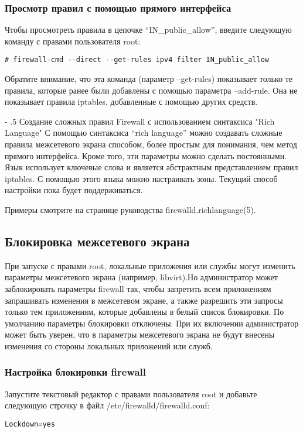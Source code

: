 \documentclass[a4paper,10pt,twoside]{article}
\makeatletter
\renewcommand\paragraph{%
   \@startsection{paragraph}{4}{0mm}%
      {-\baselineskip}%
      {.5\baselineskip}%
      {\normalfont\normalsize\bfseries}}
\makeatother
\begin{document}
\subsubsection{Просмотр правил с помощью прямого интерфейса}
Чтобы просмотреть правила в цепочке “IN\_public\_allow”, введите следующую команду с правами пользователя root: 
\begin{verbatim}
# firewall-cmd --direct --get-rules ipv4 filter IN_public_allow
\end{verbatim} 
Обратите внимание, что эта команда (параметр --get-rules) показывает только те правила, которые ранее были добавлены с помощью параметра --add-rule. Она не показывает правила iptables, добавленные с помощью других средств.


\paragraph{Создание сложных правил Firewall с использованием синтаксиса "Rich Language"}
С помощью синтаксиса “rich language” можно создавать сложные правила межсетевого экрана способом, более простым для понимания, чем метод прямого интерфейса. Кроме того, эти параметры можно сделать постоянными. Язык использует ключевые слова и является абстрактным представлением правил iptables. С помощью этого языка можно настраивать зоны. Текущий способ настройки пока будет поддерживаться. 

Примеры смотрите на странице руководства firewalld.richlanguage(5).


\subsection{Блокировка межсетевого экрана}
При запуске с правами root, локальные приложения или службы могут изменить параметры межсетевого экрана (например, libvirt).Но администратор может заблокировать параметры firewall так, чтобы запретить всем приложениям запрашивать изменения в межсетевом экране, а также разрешить эти запросы только тем приложениям, которые добавлены в белый список блокировки. По умолчанию параметры блокировки отключены. При их включении администратор может быть уверен, что в параметры межсетевого экрана не будут внесены изменения со стороны локальных приложений или служб.


\subsubsection{Настройка блокировки firewall}
Запустите текстовый редактор с правами пользователя root и добавьте следующую строчку в файл /etc/firewalld/firewalld.conf:
\begin{verbatim}
Lockdown=yes
\end{verbatim} 
\end{document}
